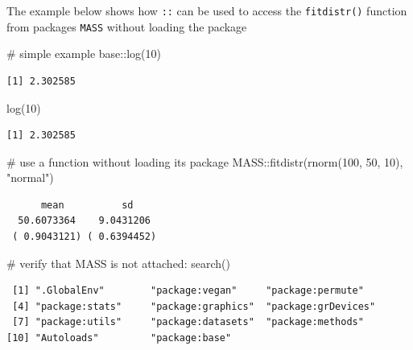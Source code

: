 \documentclass[
  13,
  letterpaper,
]{report}
\newenvironment{Shaded}{\begin{snugshade}}{\end{snugshade}}
\newcommand{\CommentTok}[1]{\textcolor[rgb]{0.37,0.37,0.37}{#1}}
\newcommand{\DecValTok}[1]{\textcolor[rgb]{0.68,0.00,0.00}{#1}}
\newcommand{\FunctionTok}[1]{\textcolor[rgb]{0.28,0.35,0.67}{#1}}
\newcommand{\NormalTok}[1]{\textcolor[rgb]{0.00,0.23,0.31}{#1}}
\newcommand{\SpecialCharTok}[1]{\textcolor[rgb]{0.37,0.37,0.37}{#1}}
\newcommand{\StringTok}[1]{\textcolor[rgb]{0.13,0.47,0.30}{#1}}
\begin{document}
The example below shows how \texttt{::} can be used to access the
\texttt{fitdistr()} function from packages \texttt{MASS} without loading
the package

\begin{Shaded}
\begin{Highlighting}[]
\CommentTok{\# simple example}
\NormalTok{base}\SpecialCharTok{::}\FunctionTok{log}\NormalTok{(}\DecValTok{10}\NormalTok{)}
\end{Highlighting}
\end{Shaded}

\begin{verbatim}
[1] 2.302585
\end{verbatim}

\begin{Shaded}
\begin{Highlighting}[]
\FunctionTok{log}\NormalTok{(}\DecValTok{10}\NormalTok{)}
\end{Highlighting}
\end{Shaded}

\begin{verbatim}
[1] 2.302585
\end{verbatim}

\begin{Shaded}
\begin{Highlighting}[]
\CommentTok{\# use a function without loading its package}
\NormalTok{MASS}\SpecialCharTok{::}\FunctionTok{fitdistr}\NormalTok{(}\FunctionTok{rnorm}\NormalTok{(}\DecValTok{100}\NormalTok{, }\DecValTok{50}\NormalTok{, }\DecValTok{10}\NormalTok{), }\StringTok{"normal"}\NormalTok{)}
\end{Highlighting}
\end{Shaded}

\begin{verbatim}
      mean          sd    
  50.6073364    9.0431206 
 ( 0.9043121) ( 0.6394452)
\end{verbatim}

\begin{Shaded}
\begin{Highlighting}[]
\CommentTok{\# verify that MASS is not attached:}
\FunctionTok{search}\NormalTok{()}
\end{Highlighting}
\end{Shaded}

\begin{verbatim}
 [1] ".GlobalEnv"        "package:vegan"     "package:permute"  
 [4] "package:stats"     "package:graphics"  "package:grDevices"
 [7] "package:utils"     "package:datasets"  "package:methods"  
[10] "Autoloads"         "package:base"     
\end{verbatim}
\end{document}
